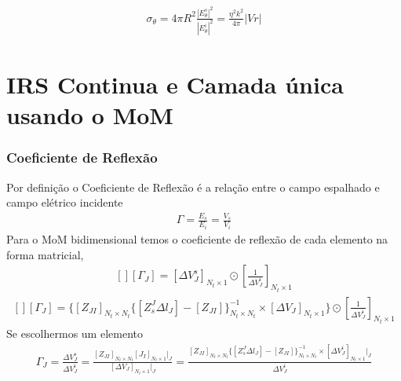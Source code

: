 \documentclass[
	12pt,				%
	openright,			%
	oneside,			%
	a4papey79r,			%
	english,			%
	brazil				%
	]{abntex2}
\begin{document}
 \begin{equation}
\begin{aligned}
\sigma_{\theta}=4\pi R^2\frac{|E_{\theta}^s|^2}{|E_{\theta}^{i}|^2}=
\frac{\eta^2 k^2}{4 \pi}|Vr|
   \end{aligned}
\end{equation}

\chapter{IRS Continua e Camada única usando o MoM}

\subsection{Coeficiente de Reflexão}
Por definição o Coeficiente de Reflexão é a relação entre o campo espalhado e campo elétrico incidente
 \begin{equation}
\begin{aligned}
 \Gamma= \frac{E_s}{E_i}=\frac{V_s}{V_i}
   \end{aligned}
\end{equation}
Para o MoM bidimensional temos o coeficiente de reflexão de cada elemento na forma matricial,
\begin{equation}
\begin{aligned}
 [][ \Gamma_J  
 ]  = [\Delta V_J^s]_{N_t \times 1}\odot{[\frac{1}{\Delta V_J^i}]_{N_t \times 1}}
   \end{aligned}
\end{equation}
\begin{equation}
\begin{aligned}
[][ \Gamma_J  
 ]=
  \biggl\{[Z_{JI}]_{N_t \times N_t} \{ [Z_{s}^J\Delta l_J]-[Z_{JI}]\}^{-1}_{N_t \times N_t} \times[\Delta V_J]_{N_t \times 1} \biggl\} \odot{[\frac{1}{\Delta V_J^i}]_{N_t \times 1}}
   \end{aligned}
\end{equation}
Se escolhermos um elemento 
\begin{equation}
\begin{aligned}
  \Gamma_J = \frac{\Delta V_J^s}{\Delta V_J^i}=
  \frac{ [Z_{JI}]_{N_t \times N_t} [J_I]_{N_t \times 1}\bigg|_{J}}{[\Delta V_J]_{N_t \times 1} \bigg|_{J}}=
  \frac{ [Z_{JI}]_{N_t \times N_t} \{ [Z_{s}^J\Delta l_J]-[Z_{JI}]\}^{-1}_{N_t \times N_t} \times[\Delta V_J^i]_{N_t \times 1} \bigg|_{J} }{\Delta V_J^i } 
   \end{aligned}
\end{equation}
\end{document}
